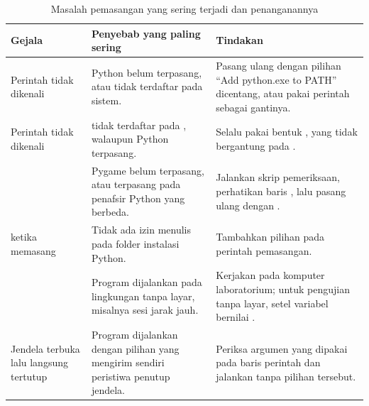 \begin{table}[htbp]
\centering
\caption{Masalah pemasangan yang sering terjadi dan penanganannya}
\label{tab:masalah-pemasangan}
{\setlength{\tabcolsep}{4pt}\footnotesize%
\begin{tabularx}{\textwidth}{@{}L{4.0cm} L{4.0cm} Y@{}}
\toprule
\headrow \textbf{Gejala} & \textbf{Penyebab yang paling sering} & \textbf{Tindakan} \\
\midrule
Perintah  tidak dikenali &
Python belum terpasang, atau tidak terdaftar pada  sistem. &
Pasang ulang dengan pilihan ``Add python.exe to PATH'' dicentang, atau pakai
perintah  sebagai gantinya. \\
\addlinespace
Perintah  tidak dikenali &
 tidak terdaftar pada , walaupun Python terpasang. &
Selalu pakai bentuk , yang tidak bergantung pada
. \\
\addlinespace
{} &
Pygame belum terpasang, atau terpasang pada penafsir Python yang berbeda. &
Jalankan skrip pemeriksaan, perhatikan baris , lalu
pasang ulang dengan . \\
\addlinespace
{} ketika memasang &
Tidak ada izin menulis pada folder instalasi Python. &
Tambahkan pilihan  pada perintah pemasangan. \\
\addlinespace
{} &
Program dijalankan pada lingkungan tanpa layar, misalnya sesi jarak jauh. &
Kerjakan pada komputer laboratorium; untuk pengujian tanpa layar, setel
variabel  bernilai . \\
\addlinespace
Jendela terbuka lalu langsung tertutup &
Program dijalankan dengan pilihan  yang mengirim sendiri
peristiwa penutup jendela. &
Periksa argumen yang dipakai pada baris perintah dan jalankan tanpa pilihan
tersebut. \\
\bottomrule
\end{tabularx}}
\end{table}
